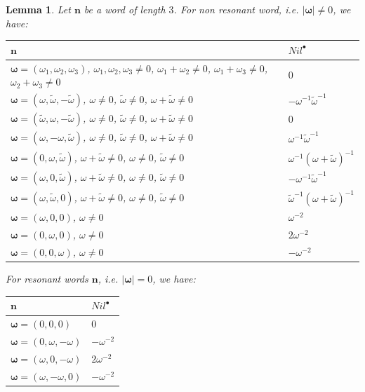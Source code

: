 \documentclass[english,11pt]{amsart}
\newtheorem{lemma}{Lemma}
\def\nn{\mathbf{n}}
\def\nn{\mathbf{n}}
\def\oo{\boldsymbol\omega}
\def\o{\omega}
\begin{document}
\begin{lemma}
Let $\nn$ be a word of length $3$. For non resonant word, i.e. $\mid \oo \mid \not= 0$, we have: 

\begin{center}
\begin{tabular}{|C{8cm} | L{2.5cm} |}
 \hline  $\nn$ & $Nil^{\bullet}$ \\
 \hline  $\oo =(\omega_1 ,\omega_2 ,\omega_3 )$, $\omega_1 ,\omega_2 ,\omega_3 \not=0$, $\omega_1 +\omega_2 \not= 0$, $\omega_1 +\omega_3 \not=0$, $\omega_2 +\omega_3 \not= 0$ & $0$ \\
\hline  $\oo = (\omega , \tilde{\omega} , -\tilde{\omega} )$, $\omega\not= 0$, $\tilde{\omega}\not= 0$, $ \o + \tilde{\o} \neq 0$ & $-\omega^{-1} \tilde{\omega}^{-1}$ \\
\hline  $\oo = (\tilde{\omega} , \omega ,-\tilde{\omega} )$, $\omega\not= 0$, $\tilde{\omega}\not= 0$, $ \o + \tilde{\o} \neq 0$ & $0$ \\
\hline  $\oo = (\omega , -\omega,  \tilde{\omega}  )$, $\omega\not= 0$, $\tilde{\omega}\not= 0$, $ \o + \tilde{\o} \neq 0$ & $\omega^{-1} \tilde{\omega}^{-1}$ \\
\hline   $\oo =(0,\omega ,\tilde{\omega} )$, $\omega+\tilde{\omega} \not= 0$, $\omega\not= 0$, $\tilde{\omega}\not= 0$ & $\omega^{-1}(\omega+\tilde{\o})^{-1}$\\
\hline    $\oo =(\omega ,0,\tilde{\omega} ) $, $\omega+\tilde{\omega} \not= 0$, $\omega\not= 0$, $\tilde{\omega}\not= 0$ & $-\omega^{-1}\tilde{\o}^{-1}$\\
\hline $\oo =(\omega ,\tilde{\omega} ,0) $, $\omega+\tilde{\omega} \not= 0$, $\omega\not= 0$, $\tilde{\omega}\not= 0$ & $\tilde{\omega}^{-1}(\o+\tilde{\o})^{-1}$\\
\hline  $\oo =(\omega ,0,0)$, $\omega\not=0$ & $\omega^{-2}$\\
\hline  $\oo =(0,\omega ,0)$, $\omega\not=0$ & $2\omega^{-2}$\\
\hline  $\oo =(0,0 ,\omega )$, $\omega\not=0$ & $-\omega^{-2}$\\
\hline
\end{tabular}
\end{center}


For resonant words $\nn$, i.e. $\mid \oo \mid =0$, we have:

\begin{center}
\begin{tabular}{|R{9cm} | L{1.5cm} |}
 \hline   $\nn$ & $Nil^{\bullet}$ \\
 \hline   $\oo = (0 ,0 ,0)$ & $0$ \\
 \hline   $\oo = (0 ,\omega ,-\omega )$ & $-\omega^{-2}$ \\
\hline   $\oo = (\omega  ,0 ,-\omega )$ & $2\omega^{-2}$ \\
\hline   $\oo = (\omega  ,-\omega  ,0)$ & $-\omega^{-2}$\\
\hline
\end{tabular}
\end{center}
\end{lemma}
\end{document}
